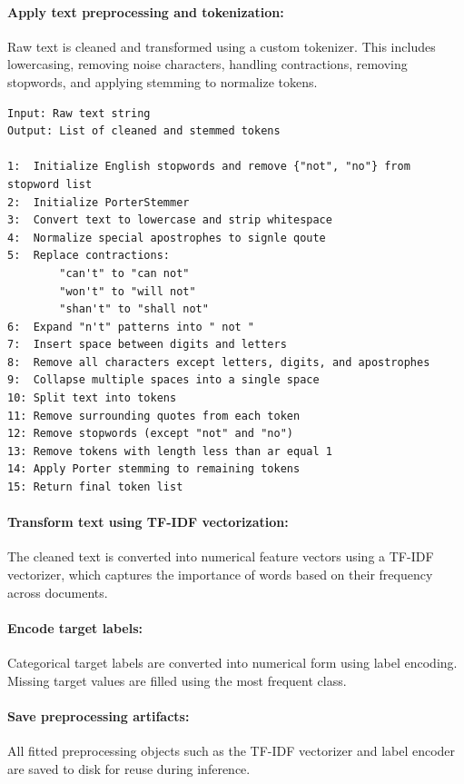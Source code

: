 \paragraph{Apply text preprocessing and tokenization:}\par
Raw text is cleaned and transformed using a custom tokenizer. This includes lowercasing, removing noise characters, handling contractions, removing stopwords, and applying stemming to normalize tokens.
\begin{lstlisting}[style=algostyle,caption={Custom Text Tokenizer},label={alg:custom_text_tokenizer}]
Input: Raw text string
Output: List of cleaned and stemmed tokens

1:  Initialize English stopwords and remove {"not", "no"} from stopword list
2:  Initialize PorterStemmer
3:  Convert text to lowercase and strip whitespace
4:  Normalize special apostrophes to signle qoute
5:  Replace contractions:
        "can't" to "can not"
        "won't" to "will not"
        "shan't" to "shall not"
6:  Expand "n't" patterns into " not "
7:  Insert space between digits and letters
8:  Remove all characters except letters, digits, and apostrophes
9:  Collapse multiple spaces into a single space
10: Split text into tokens
11: Remove surrounding quotes from each token
12: Remove stopwords (except "not" and "no")
13: Remove tokens with length less than ar equal 1
14: Apply Porter stemming to remaining tokens
15: Return final token list
\end{lstlisting}
\vspace{1cm}
\paragraph{Transform text using TF-IDF vectorization:}\par
The cleaned text is converted into numerical feature vectors using a TF-IDF vectorizer, which captures the importance of words based on their frequency across documents.
\vspace{1cm}
\paragraph{Encode target labels:}\par
Categorical target labels are converted into numerical form using label encoding. Missing target values are filled using the most frequent class.
\vspace{1cm}
\paragraph{Save preprocessing artifacts:}\par
All fitted preprocessing objects such as the TF-IDF vectorizer and label encoder are saved to disk for reuse during inference.
\vspace{1cm}
